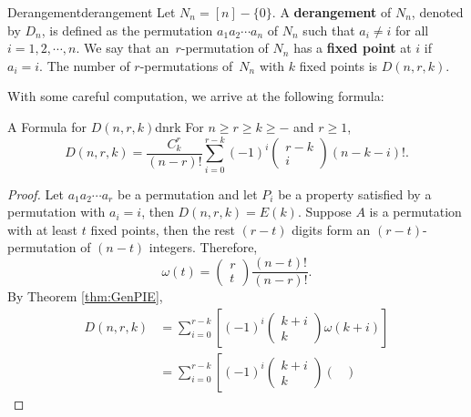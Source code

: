 \documentclass[math]{amznotes}
\theoremstyle{remark}
\newcommand{\0}{\mathbf{0}}
\newcommand{\1}{\mathbf{1}}
\begin{document}
\begin{dfnbox}{Derangement}{derangement}
    Let $N_n = [n] - \{0\}$. A {\color{red} \textbf{derangement}} of $N_n$, denoted by $D_n$, is defined as the permutation $a_1a_2\cdots a_n$ of $N_n$ such that $a_i \neq i$ for all $i = 1, 2, \cdots, n$. We say that an~$r$-permutation of $N_n$ has a {\color{red} \textbf{fixed point}} at $i$ if $a_i = i$. The number of $r$-permutations of~$N_n$ with $k$ fixed points is $D(n, r, k)$.
\end{dfnbox}
With some careful computation, we arrive at the following formula:
\begin{thmbox}{A Formula for $D(n, r, k)$}{dnrk}
    For $n \geq r \geq k \geq -$ and $r \geq 1$,
    \begin{equation*}
        D(n, r, k) = \frac{C^r_k}{(n - r)!}\sum_{i = 0}^{r - k}(-1)^i \begin{pmatrix}
            r - k \\
            i
        \end{pmatrix}(n - k - i)!.
    \end{equation*}
    \tcblower
    \begin{proof}
        Let $a_1a_2\cdots a_r$ be a permutation and let $P_i$ be a property satisfied by a permutation with $a_i = i$, then $D(n, r, k) = E(k)$. Suppose $A$ is a permutation with at least $t$ fixed points, then the rest $(r - t)$ digits form an $(r - t)$-permutation of $(n - t)$ integers. Therefore, 
        \begin{equation*}
            \omega(t) = \begin{pmatrix}
                r \\
                t
            \end{pmatrix}\frac{(n - t)!}{(n - r)!}.
        \end{equation*}
        By Theorem \ref{thm:GenPIE},
        \begin{align*}
            D(n, r, k) & = \sum_{i = 0}^{r - k}\left[(-1)^i\begin{pmatrix}
                k + i \\
                k
            \end{pmatrix}\omega(k + i)\right] \\
            & = \sum_{i = 0}^{r - k}\left[(-1)^i\begin{pmatrix}
                k + i \\
                k
            \end{pmatrix}\begin{pmatrix}

\end{pmatrix}
\end{align*}
\end{proof}
\end{thmbox}
\end{document}
